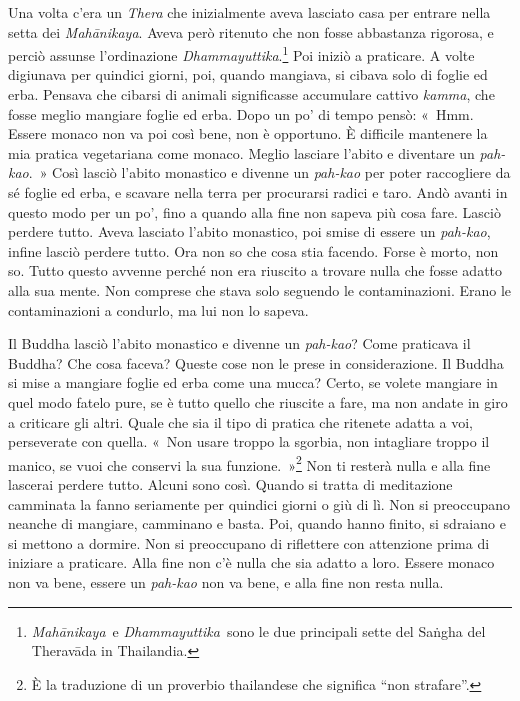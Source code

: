 Una volta c'era un \emph{Thera} che inizialmente aveva lasciato casa per
entrare nella setta dei \emph{Mahānikaya}. Aveva però ritenuto che non
fosse abbastanza rigorosa, e perciò assunse l'ordinazione
\emph{Dhammayuttika}.\footnote{\emph{Mahānikaya}~e
  \emph{Dhammayuttika}~sono le due principali sette del Saṅgha del
  Theravāda in Thailandia.} Poi iniziò a praticare. A volte digiunava
per quindici giorni, poi, quando mangiava, si cibava solo di foglie ed
erba. Pensava che cibarsi di animali significasse accumulare cattivo
\emph{kamma}, che fosse meglio mangiare foglie ed erba. Dopo un po' di
tempo pensò: «~Hmm. Essere monaco non va poi così bene, non è opportuno.
È difficile mantenere la mia pratica vegetariana come monaco. Meglio
lasciare l'abito e diventare un \emph{pah-kao}.~» Così lasciò l'abito
monastico e divenne un \emph{pah-kao} per poter raccogliere da sé foglie
ed erba, e scavare nella terra per procurarsi radici e taro. Andò avanti
in questo modo per un po', fino a quando alla fine non sapeva più cosa
fare. Lasciò perdere tutto. Aveva lasciato l'abito monastico, poi smise
di essere un \emph{pah-kao}, infine lasciò perdere tutto. Ora non so che
cosa stia facendo. Forse è morto, non so. Tutto questo avvenne perché
non era riuscito a trovare nulla che fosse adatto alla sua mente. Non
comprese che stava solo seguendo le contaminazioni. Erano le
contaminazioni a condurlo, ma lui non lo sapeva.

Il Buddha lasciò l'abito monastico e divenne un \emph{pah-kao}? Come
praticava il Buddha? Che cosa faceva? Queste cose non le prese in
considerazione. Il Buddha si mise a mangiare foglie ed erba come una
mucca? Certo, se volete mangiare in quel modo fatelo pure, se è tutto
quello che riuscite a fare, ma non andate in giro a criticare gli altri.
Quale che sia il tipo di pratica che ritenete adatta a voi, perseverate
con quella. «~Non usare troppo la sgorbia, non intagliare troppo il
manico, se vuoi che conservi la sua funzione.~»\footnote{È la traduzione
  di un proverbio thailandese che significa ``non strafare''.} Non ti
resterà nulla e alla fine lascerai perdere tutto. Alcuni sono così.
Quando si tratta di meditazione camminata la fanno seriamente per
quindici giorni o giù di lì. Non si preoccupano neanche di mangiare,
camminano e basta. Poi, quando hanno finito, si sdraiano e si mettono a
dormire. Non si preoccupano di riflettere con attenzione prima di
iniziare a praticare. Alla fine non c'è nulla che sia adatto a loro.
Essere monaco non va bene, essere un \emph{pah-kao} non va bene, e alla
fine non resta nulla.

